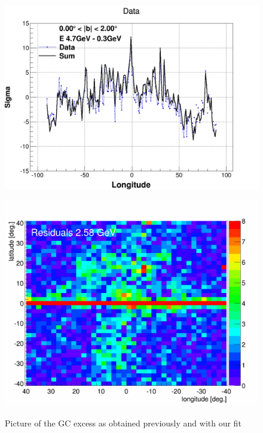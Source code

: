 \begin{figure}[h]
  \centering
  \begin{minipage}[h]{0.45\textwidth}
  	\centering
	\includegraphics[width=1.\linewidth]{pic/results/Weniger_SUM_b0-2_E4,7-0,31GeV.png}
  	\label{fig:weniger_plot}
  \end{minipage}
  \hfill
  \begin{minipage}[h]{0.45\textwidth}
	  \centering
	  \includegraphics[width=1.\linewidth]{pic/results/BKGonly_halo_residuals.png}
	  \label{fig:our_excess}
  \end{minipage}
  \caption{Picture of the GC excess as obtained previously and with our fit}
  \label{fig:GC_excess}	 
\end{figure}

